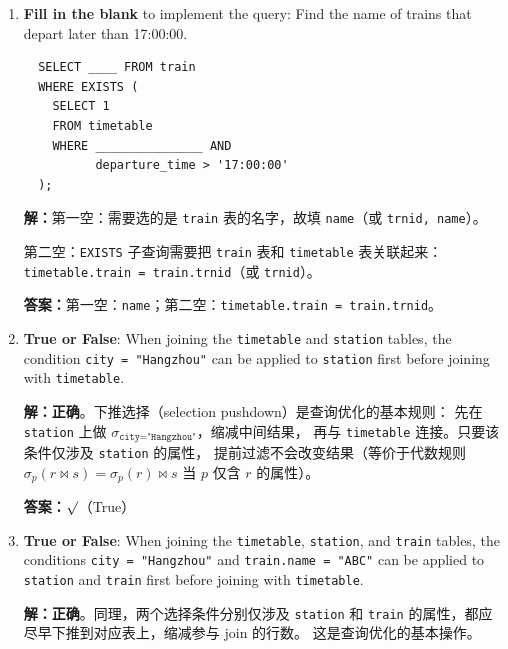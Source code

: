 \documentclass[11pt,a4paper]{article}
\newcommand{\solution}{\par\noindent\textcolor{ansblue}{\textbf{解：}}}
\newcommand{\answer}{\par\noindent\textcolor{ansred}{\textbf{答案：}}}
\begin{document}
\begin{enumerate}[leftmargin=*,itemsep=6pt]
  \solution 正确。用 \texttt{EXISTS} 半连接分别检查 A 始发和 B 到达，
  价格排序取最低。逻辑等价于 join 写法。

  \answer \textcolor{ansred}{$\surd$（True）}

  \answer 四者全部正确。

\item \textbf{Fill in the blank} to implement the query: Find the name of trains
  that depart later than 17:00:00.

  \begin{verbatim}
  SELECT ____ FROM train
  WHERE EXISTS (
    SELECT 1
    FROM timetable
    WHERE _______________ AND
          departure_time > '17:00:00'
  );
  \end{verbatim}

  \solution 第一空：需要选的是 \texttt{train} 表的名字，故填 \texttt{name}（或 \texttt{trnid, name}）。

  第二空：\texttt{EXISTS} 子查询需要把 \texttt{train} 表和 \texttt{timetable} 表关联起来：
  \texttt{timetable.train = train.trnid}（或 \texttt{trnid}）。

  \answer 第一空：\textcolor{ansred}{\texttt{name}}；第二空：\textcolor{ansred}{\texttt{timetable.train = train.trnid}}。

\item \textbf{True or False}: When joining the \texttt{timetable} and
  \texttt{station} tables, the condition \texttt{city = "Hangzhou"} can be
  applied to \texttt{station} first before joining with \texttt{timetable}.

  \solution \textbf{正确}。下推选择（selection pushdown）是查询优化的基本规则：
  先在 \texttt{station} 上做 $\sigma_{\texttt{city="Hangzhou"}}$，缩减中间结果，
  再与 \texttt{timetable} 连接。只要该条件仅涉及 \texttt{station} 的属性，
  提前过滤不会改变结果（等价于代数规则 $\sigma_p(r \Join s) = \sigma_p(r) \Join s$ 当 $p$ 仅含 $r$ 的属性）。

  \answer \textcolor{ansred}{$\surd$（True）}

\item \textbf{True or False}: When joining the \texttt{timetable}, \texttt{station},
  and \texttt{train} tables, the conditions \texttt{city = "Hangzhou"} and
  \texttt{train.name = "ABC"} can be applied to \texttt{station} and \texttt{train}
  first before joining with \texttt{timetable}.

  \solution \textbf{正确}。同理，两个选择条件分别仅涉及 \texttt{station} 和
  \texttt{train} 的属性，都应尽早下推到对应表上，缩减参与 join 的行数。
  这是查询优化的基本操作。


\end{enumerate}
\end{document}
